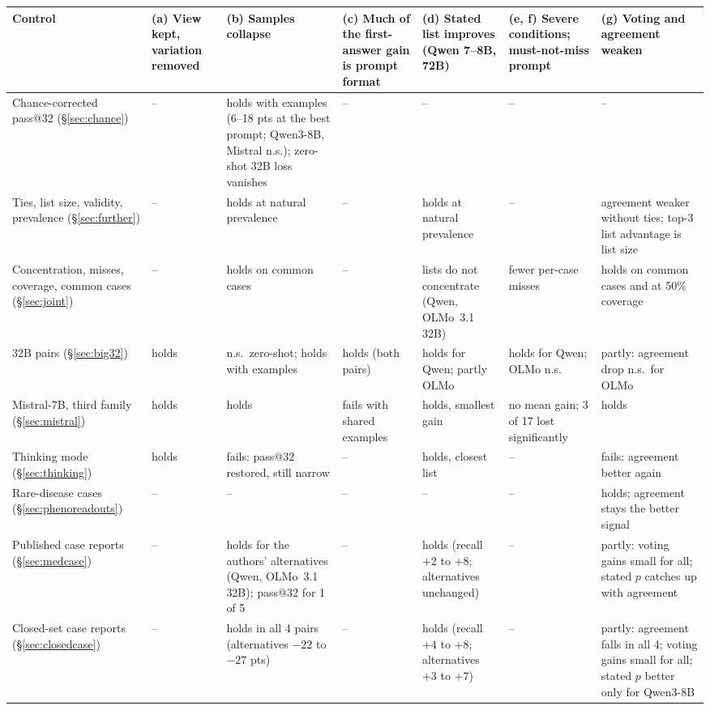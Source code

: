 \documentclass[11pt]{article}
\begin{document}
\begin{table}[p]
\centering\tiny
\setlength{\tabcolsep}{2.5pt}
\renewcommand{\arraystretch}{1.05}
\begin{tabular}{L{2.2cm}L{1.7cm}L{2.0cm}L{1.8cm}L{2.0cm}L{2.3cm}L{1.9cm}}
\toprule
Control & (a) View kept, variation removed & (b) Samples collapse & (c) Much of the first-answer gain is prompt format & (d) Stated list improves (Qwen 7--8B, 72B) & (e, f) Severe conditions; must-not-miss prompt & (g) Voting and agreement weaken \\
\midrule
Chance-corrected pass@32 (\S\ref{sec:chance}) & -- & holds with examples (6--18 pts at the best prompt; Qwen3-8B, Mistral n.s.); zero-shot 32B loss vanishes & -- & -- & -- & -- \\
Ties, list size, validity, prevalence (\S\ref{sec:further}) & -- & holds at natural prevalence & -- & holds at natural prevalence & -- & agreement weaker without ties; top-3 list advantage is list size \\
Concentration, misses, coverage, common cases (\S\ref{sec:joint}) & -- & holds on common cases & -- & lists do not concentrate (Qwen, OLMo~3.1 32B) & fewer per-case misses & holds on common cases and at 50\% coverage \\
32B pairs (\S\ref{sec:big32}) & holds & n.s.\ zero-shot; holds with examples & holds (both pairs) & holds for Qwen; partly OLMo & holds for Qwen; OLMo n.s. & partly: agreement drop n.s.\ for OLMo \\
Mistral-7B, third family (\S\ref{sec:mistral}) & holds & holds & fails with shared examples & holds, smallest gain & no mean gain; 3 of 17 lost significantly & holds \\
Thinking mode (\S\ref{sec:thinking}) & holds & fails: pass@32 restored, still narrow & -- & holds, closest list & -- & fails: agreement better again \\
Rare-disease cases (\S\ref{sec:phenoreadouts}) & -- & -- & -- & -- & -- & holds; agreement stays the better signal \\
Published case reports (\S\ref{sec:medcase}) & -- & holds for the authors' alternatives (Qwen, OLMo~3.1 32B); pass@32 for 1 of 5 & -- & holds (recall $+2$ to $+8$; alternatives unchanged) & -- & partly: voting gains small for all; stated $p$ catches up with agreement \\
Closed-set case reports (\S\ref{sec:closedcase}) & -- & holds in all 4 pairs (alternatives $-22$ to $-27$ pts) & -- & holds (recall $+4$ to $+8$; alternatives $+3$ to $+7$) & -- & partly: agreement falls in all 4; voting gains small for all; stated $p$ better only for Qwen3-8B \\

\end{tabular}
\end{table}
\end{document}
